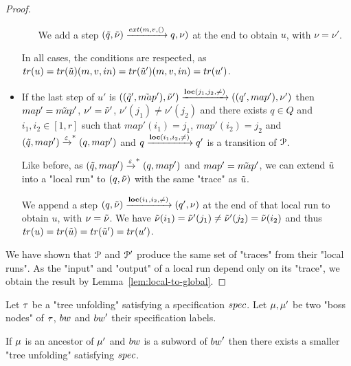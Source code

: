 \begin{proof}
\begin{itemize}
\begin{itemize}
			We add a step $(\Tilde{q}, \Tilde{\nu}) \extbr{m,v} (q, \nu)$ at the end to obtain $u$, with $\nu = \nu'$.
		\end{itemize}
	
		In all cases, the conditions are respected, as $\trace{u} = \trace{\Tilde{u}} (m,v, in) = \trace{\Tilde{u}'} (m,v, in) = \trace{u'}$.
		
		\item If the last step of $u'$ is $((\Tilde{q}', \Tilde{map}'), \Tilde{\nu}') \xrightarrow{\textbf{loc}(j_1,j_2,{\ne})} ((q', map'), \nu')$ then $map'=\Tilde{map}'$, $\nu' = \Tilde{\nu}'$, $\nu'(j_1) \neq \nu'(j_2)$ and there exists $q \in Q$ and $i_1, i_2 \in [1,r]$ such that $map'(i_1)=j_1$, $map'(i_2)=j_2$ and $(\Tilde{q}, map') \xrightarrow{\varepsilon}^* (q, map')$ and $q \xrightarrow{\textbf{loc}(i_1,i_2,{\ne})} q'$ is a transition of $\mathcal{P}$.
		
		Like before, as $(\Tilde{q}, map') \xrightarrow{\varepsilon}^* (q, map')$ and $map'=\Tilde{map}'$, we can extend $\Tilde{u}$ into a "local run" to $(q, \Tilde{\nu})$ with the same "trace" as $\Tilde{u}$.
		
		
		We append a step $(q, \Tilde{\nu}) \xrightarrow{\textbf{loc}(i_1,i_2,{\ne})} (q', \nu)$ at the end of that local run to obtain $u$, with $\nu = \Tilde{\nu}$. We have $\Tilde{\nu}(i_1) = \Tilde{\nu}'(j_1) \neq \Tilde{\nu}'(j_2) = \Tilde{\nu}(i_2)$ and thus $\trace{u} = \trace{\Tilde{u}} = \trace{\Tilde{u}'} = \trace{u'}$.
	\end{itemize}

We have shown that $\mathcal{P}$ and $\mathcal{P}'$ produce the same set of "traces" from their "local runs". As the "input" and "output" of a local run depend only on its "trace", we obtain the result by Lemma~\ref{lem:local-to-global}.
\end{proof}
\fi

\begin{lemma}
	Let $\tau$ be a "tree unfolding" satisfying a specification $\spec$.
	Let $\mu, \mu'$ be two "boss nodes" of $\tau$, $\bossspec$ and $\bossspec'$ their specification labels.
	
	If $\mu$ is an ancestor of $\mu'$ and $\bossspec$ is a subword of $\bossspec'$ then there exists a smaller "tree unfolding" satisfying $\spec$.  
\end{lemma}

